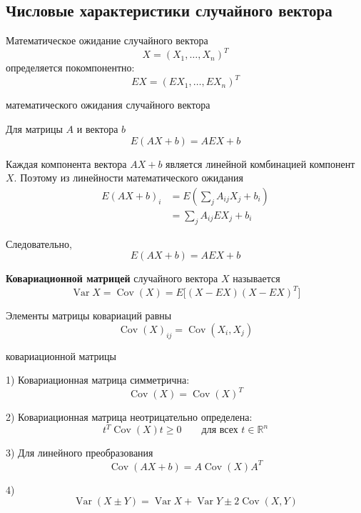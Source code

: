 \documentclass[12pt,a4paper]{article}
\begin{document}
\subsection{Числовые характеристики случайного вектора}

\begin{definition}

Математическое ожидание случайного вектора
\[
X=(X_1,\ldots,X_n)^T
\]
определяется покомпонентно:
\[
EX
=
(EX_1,\ldots,EX_n)^T
\]

\end{definition}

\begin{props}{математического ожидания случайного вектора}

Для матрицы $A$ и вектора $b$
\[
E(AX+b)=AEX+b
\]

\end{props}

\begin{proofbox}{}

Каждая компонента вектора $AX+b$ является линейной комбинацией компонент $X$. Поэтому из линейности математического ожидания
\[
\begin{aligned}
E(AX+b)_i
&=
E\left(
\sum_j A_{ij}X_j+b_i
\right)\\
&=
\sum_jA_{ij}EX_j+b_i
\end{aligned}
\]

Следовательно,
\[
E(AX+b)=AEX+b
\]

\end{proofbox}

\begin{definition}

\textbf{Ковариационной матрицей} случайного вектора $X$ называется
\[
\operatorname{Var}X
=
\operatorname{Cov}(X)
=
E\bigl[(X-EX)(X-EX)^T\bigr]
\]

Элементы матрицы ковариаций равны
\[
\operatorname{Cov}(X)_{ij}
=
\operatorname{Cov}(X_i,X_j)
\]

\end{definition}

\begin{props}{ковариационной матрицы}

1) Ковариационная матрица симметрична:
\[
\operatorname{Cov}(X)
=
\operatorname{Cov}(X)^T
\]

\medskip

2) Ковариационная матрица неотрицательно определена:
\[
t^T\operatorname{Cov}(X)t\geq0
\qquad
\text{для всех }t\in\mathbb{R}^n
\]

\medskip

3) Для линейного преобразования
\[
\operatorname{Cov}(AX+b)
=
A\operatorname{Cov}(X)A^T
\]

\medskip

4)
\[
\operatorname{Var}(X\pm Y)
=
\operatorname{Var}X+\operatorname{Var}Y
\pm2\operatorname{Cov}(X,Y)
\]

\end{props}
\end{document}
